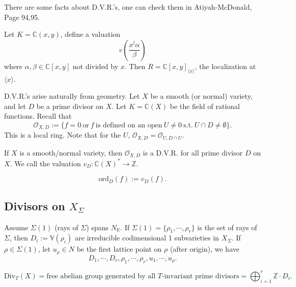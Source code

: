 \documentclass[a4paper,12pt]{amsart}
\newcommand{\ZZ}{\mathbb{Z}}
\newcommand{\RR}{\mathbb{R}}
\newcommand{\CC}{\mathbb{C}}
\begin{document}
There are some facts about D.V.R.'s, one can check them in Atiyah-McDonald, Page 94,95.

\begin{example}
	Let $K=\CC(x,y)$, define a valuation
	\begin{displaymath}
	v\left(\frac{x^l\alpha}{\beta}\right)
	\end{displaymath}
	where $\alpha,\beta\in\CC[x,y]$ not divided by $x$. Then $R=\CC[x,y]_{\langle x\rangle}$, the localization at $\langle x\rangle$.
\end{example}

D.V.R.'s arise naturally from geometry. Let $X$ be a smooth (or normal) variety, and let $D$ be a prime divisor on $X$. Let $K=\CC(X)$ be the field of rational functions. Recall that
\begin{displaymath}
\mathscr{O}_{X,D}:=\{f=0~\text{or}~f~\text{is defined on an open}~U\neq0~\text{s.t.}~U\cap D\neq\emptyset\}.
\end{displaymath}
This is a local ring. Note that for the $U$, $\mathscr{O}_{X,D}=\mathscr{O}_{U,D\cap U}$.

\begin{Theorem}
	If $X$ is a smooth/normal variety, then $\mathscr{O}_{X,D}$ is a D.V.R. for all prime divisor $D$ on $X$. We call the valuation $v_D:\CC(X)^*\to\ZZ$.
\end{Theorem}

\begin{definition}
	\begin{displaymath}
	\mathrm{ord}_D(f):=v_D(f).
	\end{displaymath}
\end{definition}

\subsection{Divisors on $X_\Sigma$}

Assume $\Sigma(1)$ (rays of $\Sigma$) spans $N_\RR$. If $\Sigma(1)=\{\rho_1,\cdots,\rho_r\}$ is the set of rays of $\Sigma$, then $D_i:=\mathbb{V}(\rho_i)$ are irreducible codimensional 1 subvarieties in $X_\Sigma$. If $\rho\in\Sigma(1)$, let $u_\rho\in N$ be the first lattice point on $\rho$ (after origin), we have
\begin{displaymath}
D_1,\cdots,D_r,\rho_1,\cdots,\rho_r,u_1,\cdots,u_\rho.
\end{displaymath}

\begin{Def}
	\begin{displaymath}
	\mathrm{Div}_T(X)=\text{free abelian group generated by all }T\text{-invariant prime divisors}=\bigoplus_{i=1}^r\ZZ\cdot D_i.
	\end{displaymath}
\end{Def}
\end{document}
